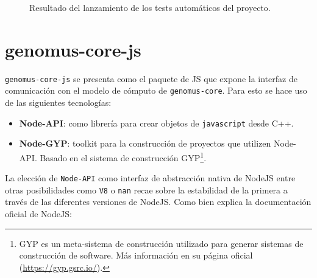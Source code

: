 \begin{figure}
    \centering
    \caption{Resultado del lanzamiento de los tests automáticos del proyecto.}
    \label{fig:tests_output}
\end{figure}



\section{genomus-core-js}

\verb|genomus-core-js| se presenta como el paquete de JS que expone la interfaz de comunicación con el modelo de cómputo de \verb|genomus-core|. Para esto se hace uso de las siguientes tecnologías:

\begin{itemize}
    \item \textbf{Node-API}: como librería para crear objetos de \verb|javascript| desde C++. 
    \item \textbf{Node-GYP}: toolkit para la construcción de proyectos que utilizen Node-API. Basado en el sistema de construcción GYP\footnote{
        GYP es un meta-sistema de construcción utilizado para generar sistemas de construcción de software. Más información en su página oficial (\url{https://gyp.gsrc.io/}).
    }.
\end{itemize}

La elección de \verb|Node-API| como interfaz de abstracción nativa de NodeJS entre otras posibilidades como \verb|V8|\cite{V8-API} o \verb|nan|\cite{node-nan} recae sobre la estabilidad de la primera a través de las diferentes versiones de NodeJS. Como bien explica la documentación oficial de NodeJS\cite{node-addon-docs}:


